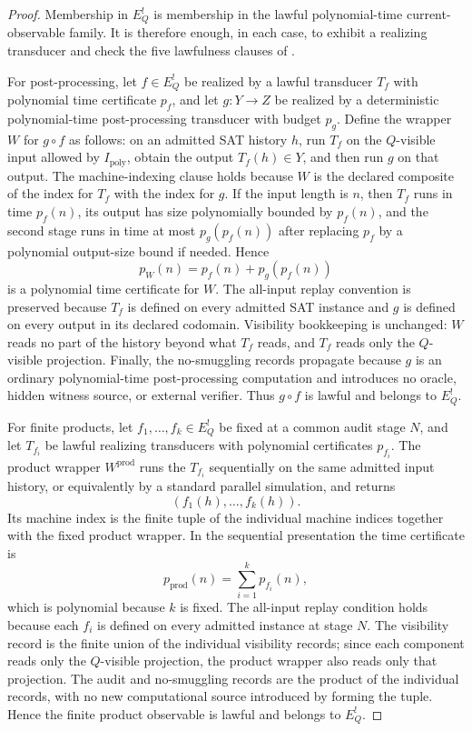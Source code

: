 \documentclass[11pt]{article}
\newcommand{\Ipoly}{I_{\mathrm{poly}}}
\newcommand{\EQbang}{E^{!}_{Q}}
\theoremstyle{definition}
\begin{document}
\begin{proof}
Membership in \(\EQbang\) is membership in the lawful
polynomial-time current-observable family.  It is therefore enough, in
each case, to exhibit a realizing transducer and check the five
lawfulness clauses of .

For post-processing, let \(f\in\EQbang\) be realized by a lawful
transducer \(T_f\) with polynomial time certificate \(p_f\), and let
\(g:Y\to Z\) be realized by a deterministic polynomial-time
post-processing transducer with budget \(p_g\).  Define the wrapper
\(W\) for \(g\circ f\) as follows: on an admitted SAT history \(h\),
run \(T_f\) on the \(Q\)-visible input allowed by \(\Ipoly\), obtain
the output \(T_f(h)\in Y\), and then run \(g\) on that output.  The
machine-indexing clause holds because \(W\) is the declared composite
of the index for \(T_f\) with the index for \(g\).  If the input
length is \(n\), then \(T_f\) runs in time \(p_f(n)\), its output has
size polynomially bounded by \(p_f(n)\), and the second stage runs in
time at most \(p_g(p_f(n))\) after replacing \(p_f\) by a polynomial
output-size bound if needed.  Hence
\[
  p_W(n)=p_f(n)+p_g(p_f(n))
\]
is a polynomial time certificate for \(W\).  The all-input replay
convention is preserved because \(T_f\) is defined on every admitted
SAT instance and \(g\) is defined on every output in its declared
codomain.  Visibility bookkeeping is unchanged: \(W\) reads no part of
the history beyond what \(T_f\) reads, and \(T_f\) reads only the
\(Q\)-visible projection.  Finally, the no-smuggling records propagate
because \(g\) is an ordinary polynomial-time post-processing
computation and introduces no oracle, hidden witness source, or
external verifier.  Thus \(g\circ f\) is lawful and belongs to
\(\EQbang\).

For finite products, let \(f_1,\ldots,f_k\in\EQbang\) be fixed at a
common audit stage \(N\), and let \(T_{f_i}\) be lawful realizing
transducers with polynomial certificates \(p_{f_i}\).  The product
wrapper \(W^{\mathrm{prod}}\) runs the \(T_{f_i}\) sequentially on the
same admitted input history, or equivalently by a standard parallel
simulation, and returns
\[
  (f_1(h),\ldots,f_k(h)).
\]
Its machine index is the finite tuple of the individual machine
indices together with the fixed product wrapper.  In the sequential
presentation the time certificate is
\[
  p_{\mathrm{prod}}(n)=\sum_{i=1}^{k}p_{f_i}(n),
\]
which is polynomial because \(k\) is fixed.  The all-input replay
condition holds because each \(f_i\) is defined on every admitted
instance at stage \(N\).  The visibility record is the finite union of
the individual visibility records; since each component reads only the
\(Q\)-visible projection, the product wrapper also reads only that
projection.  The audit and no-smuggling records are the product of the
individual records, with no new computational source introduced by
forming the tuple.  Hence the finite product observable is lawful and
belongs to \(\EQbang\).


\end{proof}
\end{document}
